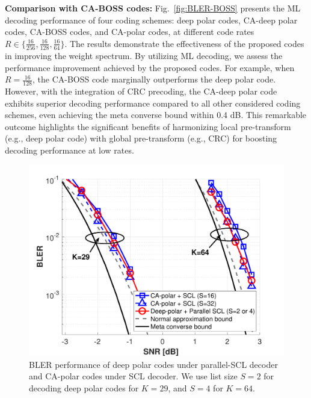\documentclass[conference]{IEEEtran}
\begin{document}
{\bf Comparison with CA-BOSS codes:}
Fig.~\ref{fig:BLER-BOSS} presents the ML decoding performance of four coding schemes: deep polar codes, CA-deep polar codes, CA-BOSS codes, and CA-polar codes, at different code rates $R\in \{\frac{16}{256},\frac{16}{128},\frac{16}{64}\}$. The results demonstrate the effectiveness of the proposed codes in improving the weight spectrum. By utilizing ML decoding, we assess the performance improvement achieved by the proposed codes. For example, when $R=\frac{16}{128}$, the CA-BOSS code marginally outperforms the deep polar code. However, with the integration of CRC precoding, the CA-deep polar code exhibits superior decoding performance compared to all other considered coding schemes, even achieving the meta converse bound within 0.4 dB. This remarkable outcome highlights the significant benefits of harmonizing local pre-transform (e.g., deep polar code) with global pre-transform (e.g., CRC) for boosting decoding performance at low rates. 




\begin{figure}[t]
\centering
\includegraphics[width=1.1\columnwidth]{BLER_DP_parallel_2.pdf}
\caption{BLER performance of deep polar codes under parallel-SCL decoder and CA-polar codes under SCL decoder. We use list size $S=2$ for decoding deep polar codes for $K=29$, and $S=4$ for $K=64$.}
\label{fig:BLER-DP-vs-SCL}
\end{figure}
\end{document}

